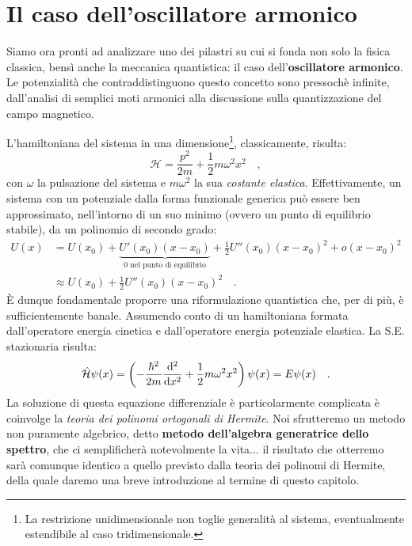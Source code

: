 
\chapter{Il caso dell'oscillatore armonico}
Siamo ora pronti ad analizzare uno dei pilastri su cui si fonda non solo la fisica classica, bensì anche la meccanica quantistica: il caso dell'\textbf{oscillatore armonico}. Le potenzialità che contraddistinguono questo concetto sono pressochè infinite, dall'analisi di semplici moti armonici alla discussione sulla quantizzazione del campo magnetico. 

L'hamiltoniana del sistema in una dimensione\footnote{La restrizione unidimensionale non toglie generalità al sistema, eventualmente estendibile al caso tridimensionale.}, classicamente, risulta:
\[
    \mathcal{H} = \frac{{p}^2}{2m} + \frac{1}{2}m\omega^2x^2 \quad, 
\] 
con $\omega$ la pulsazione del sistema e $m\omega^2$ la sua \emph{costante elastica}. Effettivamente, un sistema con un potenziale dalla forma funzionale generica può essere ben approssimato, nell'intorno di un suo minimo (ovvero un punto di equilibrio stabile), da un polinomio di secondo grado:
\[
\begin{aligned}
    U(x) &= U(x_0) + \underbrace{U'(x_0)(x-x_0)}_{\text{0 nel punto di equilibrio}} + \frac{1}{2}U''(x_0)(x-x_0)^2 + o(x-x_0)^2 \\
    &\approx U(x_0) + \frac{1}{2}U''(x_0)(x-x_0)^2 \quad.
\end{aligned}
\]
È dunque fondamentale proporre una riformulazione quantistica che, per di più, è sufficientemente banale. Assumendo conto di un hamiltoniana formata dall'operatore energia cinetica e dall'operatore energia potenziale elastica. La S.E. stazionaria risulta:
\[
    \hat{\mathcal{H}}\psi(x) = \left( -\frac{\hbar^2}{2m}\dv[2]{}{x} + \frac{1}{2}m\omega^2x^2 \right)\psi(x) = E\psi(x) \quad.
\]
La soluzione di questa equazione differenziale è particolarmente complicata è coinvolge la \emph{teoria dei polinomi ortogonali di Hermite}. Noi sfrutteremo un metodo non puramente algebrico, detto \textbf{metodo dell'algebra generatrice dello spettro}, che ci semplificherà notevolmente la vita... il risultato che otterremo sarà comunque identico a quello previsto dalla teoria dei polinomi di Hermite, della quale daremo una breve introduzione al termine di questo capitolo.


